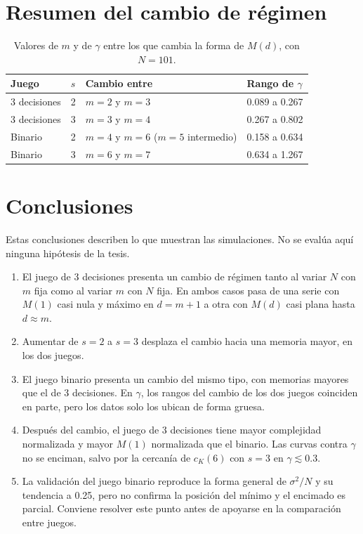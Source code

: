 \documentclass[11pt,letterpaper]{article}
\begin{document}
\section{Resumen del cambio de régimen}
\begin{table}[H]
\centering\small
\caption{Valores de $m$ y de $\gamma$ entre los que cambia la forma de $M(d)$, con $N=101$.}
\begin{tabular}{llll}
\toprule
Juego & $s$ & Cambio entre & Rango de $\gamma$\\
\midrule
3 decisiones & 2 & $m=2$ y $m=3$ & 0.089 a 0.267\\
3 decisiones & 3 & $m=3$ y $m=4$ & 0.267 a 0.802\\
Binario & 2 & $m=4$ y $m=6$ ($m=5$ intermedio) & 0.158 a 0.634\\
Binario & 3 & $m=6$ y $m=7$ & 0.634 a 1.267\\
\bottomrule
\end{tabular}
\end{table}

\section{Conclusiones}
Estas conclusiones describen lo que muestran las simulaciones. No se evalúa aquí ninguna hipótesis de la tesis.
\begin{enumerate}
\item El juego de 3 decisiones presenta un cambio de régimen tanto al variar $N$ con $m$ fija como al variar $m$ con $N$ fija. En ambos casos pasa de una serie con $M(1)$ casi nula y máximo en $d=m+1$ a otra con $M(d)$ casi plana hasta $d\approx m$.
\item Aumentar de $s=2$ a $s=3$ desplaza el cambio hacia una memoria mayor, en los dos juegos.
\item El juego binario presenta un cambio del mismo tipo, con memorias mayores que el de 3 decisiones. En $\gamma$, los rangos del cambio de los dos juegos coinciden en parte, pero los datos solo los ubican de forma gruesa.
\item Después del cambio, el juego de 3 decisiones tiene mayor complejidad normalizada y mayor $M(1)$ normalizada que el binario. Las curvas contra $\gamma$ no se enciman, salvo por la cercanía de $c_K(6)$ con $s=3$ en $\gamma\lesssim 0.3$.
\item La validación del juego binario reproduce la forma general de $\sigma^2/N$ y su tendencia a 0.25, pero no confirma la posición del mínimo y el encimado es parcial. Conviene resolver este punto antes de apoyarse en la comparación entre juegos.
\end{enumerate}
\end{document}
